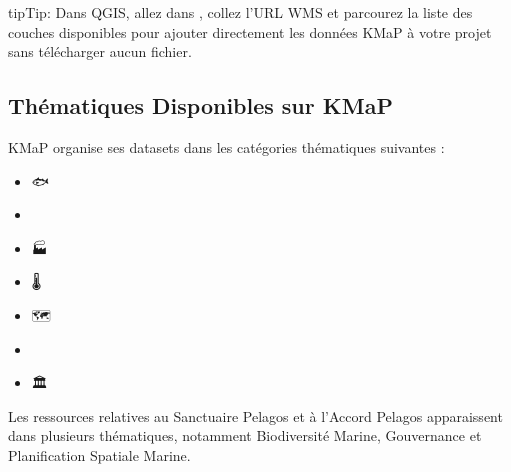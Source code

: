 \documentclass[letterpaper,10pt,english]{sphinxmanual}
\begin{document}
\begin{sphinxadmonition}{tip}{Tip:}
\sphinxAtStartPar
Dans QGIS, allez dans ,
collez l’URL WMS et parcourez la liste des couches disponibles pour ajouter directement
les données KMaP à votre projet sans télécharger aucun fichier.
\end{sphinxadmonition}


\subsection{Thématiques Disponibles sur KMaP}
\label{\detokenize{fr/01_bienvenue:thematiques-disponibles-sur-kmap}}
\sphinxAtStartPar
KMaP organise ses datasets dans les catégories thématiques suivantes :
\begin{itemize}
\item {} 
\sphinxAtStartPar
🐟  

\item {} 
\sphinxAtStartPar
🌊  

\item {} 
\sphinxAtStartPar
🏭  

\item {} 
\sphinxAtStartPar
🌡  

\item {} 
\sphinxAtStartPar
🗺  

\item {} 
\sphinxAtStartPar
💙  

\item {} 
\sphinxAtStartPar
🏛  

\end{itemize}

\sphinxAtStartPar
Les ressources relatives au Sanctuaire Pelagos et à l’Accord Pelagos apparaissent dans
plusieurs thématiques, notamment Biodiversité Marine, Gouvernance et Planification
Spatiale Marine.

\sphinxstepscope
\end{document}
